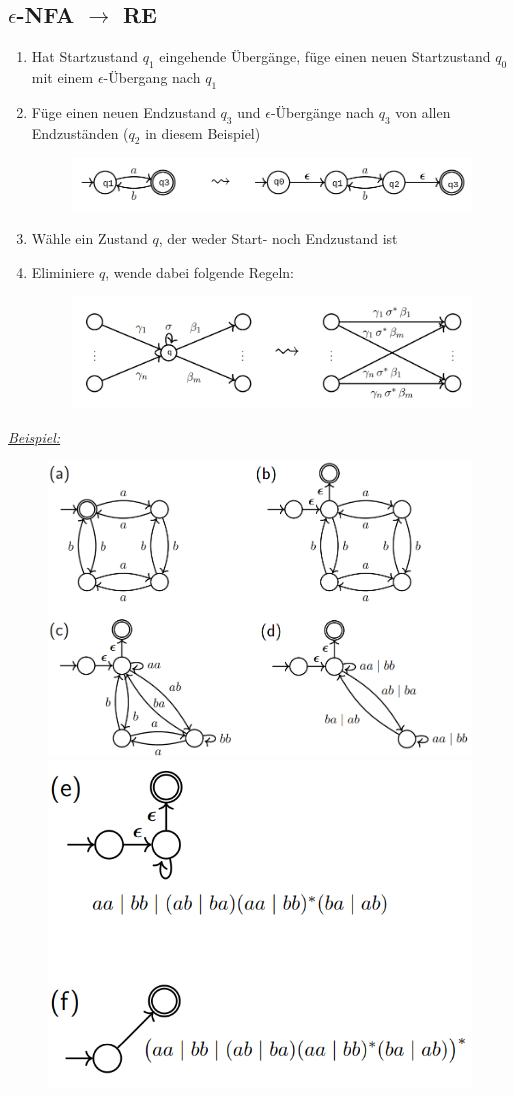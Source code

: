 \documentclass[ieeetran]{article}
\begin{document}
\subsection{$\epsilon$-NFA $\rightarrow$ RE} %
\label{sub:_epsilon_nFA_rightarrow_rE}

\begin{enumerate}
	\item Hat Startzustand $q_1$ eingehende Übergänge, füge einen neuen Startzustand $q_0$ mit einem $\epsilon$-Übergang nach $q_1$
	\item Füge einen neuen Endzustand $q_3$ und $\epsilon$-Übergänge nach $q_3$ von allen Endzuständen ($q_2$ in diesem Beispiel)

		\begin{figure}[h!]
		  \centering
		  \includegraphics[width=0.8\linewidth]{nfatoreschritt1.png}
		  \label{fig:nfatoreschritt1_png}
		\end{figure}

\item Wähle ein Zustand $q$, der weder Start- noch Endzustand ist
\item Eliminiere $q$, wende dabei folgende Regeln:
\begin{figure}[h!]
  \centering
  \includegraphics[width=0.7\linewidth]{nfatoreschritt2.png}
  \label{fig:nfatoreschritt2_png}
\end{figure}
\end{enumerate}

\textit{\underline{Beispiel:}}

\begin{figure}[h!]
  \centering
  \includegraphics[width=0.56\linewidth]{nfatorebeispiel1.png}
  \includegraphics[width=0.4\linewidth]{nfatorebeispiel2.png}
  \label{fig:nfatorebeispiel_png}
\end{figure}
\end{document}
